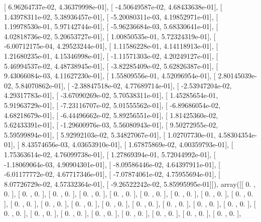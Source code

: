 \documentclass{article}
\begin{document}
       [  6.96264737e-02,   4.36379998e-01],
       [ -4.50649587e-02,   4.68433638e-01],
       [  1.43978311e-02,   5.38936457e-01],
       [ -5.20080311e-03,   4.19852971e-01],
       [  1.19978530e-01,   5.97142744e-01],
       [ -5.96236684e-03,   5.68330641e-01],
       [  4.02818736e-02,   5.20653727e-01],
       [  1.00850535e-01,   5.72324319e-01],
       [ -6.00712175e-04,   4.29523244e-01],
       [  1.11586228e-01,   4.14118913e-01],
       [  1.21680235e-01,   4.15346998e-01],
       [ -1.11571303e-02,   4.20249127e-01],
       [  5.46994537e-02,   4.48738945e-01],
       [ -3.82285409e-02,   5.62826387e-01],
       [  9.43066084e-03,   4.11627230e-01],
       [  1.55809556e-01,   4.52096954e-01],
       [  2.80145039e-02,   5.84070862e-01],
       [ -2.38847518e-02,   4.77689714e-01],
       [ -2.53947204e-02,   4.29317783e-01],
       [ -3.67090269e-02,   5.70538311e-01],
       [  1.45285654e-01,   5.91963729e-01],
       [ -7.23116707e-02,   5.01555562e-01],
       [ -6.89686054e-02,   4.68218679e-01],
       [ -6.44496662e-02,   5.89256551e-01],
       [  1.81425360e-02,   5.62433391e-01],
       [ -1.29600976e-03,   5.56080943e-01],
       [  9.50272955e-02,   5.59599894e-01],
       [  5.92992103e-02,   5.34827067e-01],
       [  1.02707730e-01,   4.58304354e-01],
       [  8.43574656e-03,   4.03653910e-01],
       [  1.67875869e-02,   4.00359793e-01],
       [  1.75363614e-02,   4.76099738e-01],
       [  1.27869394e-01,   5.72044992e-01],
       [ -1.18069064e-03,   4.90904301e-01],
       [ -8.09586446e-02,   4.64397911e-01],
       [ -6.01177772e-02,   4.67717346e-01],
       [ -7.07874061e-02,   4.75955694e-01],
       [  8.07726729e-02,   4.57332364e-01],
       [ -9.26522242e-02,   5.85995995e-01]]), array([[ 0.        ,  0.        ],
       [ 0.        ,  0.        ],
       [ 0.        ,  0.        ],
       [ 0.        ,  0.        ],
       [ 0.        ,  0.        ],
       [ 0.        ,  0.        ],
       [ 0.        ,  0.        ],
       [ 0.        ,  0.        ],
       [ 0.        ,  0.        ],
       [ 0.        ,  0.        ],
       [ 0.        ,  0.        ],
       [ 0.        ,  0.        ],
       [ 0.        ,  0.        ],
       [ 0.        ,  0.        ],
       [ 0.        ,  0.        ],
       [ 0.        ,  0.        ],
       [ 0.        ,  0.        ],
       [ 0.        ,  0.        ],
       [ 0.        ,  0.        ],
       [ 0.        ,  0.        ],
       [ 0.        ,  0.        ],
       [ 0.        ,  0.        ],
       [ 0.        ,  0.        ],
       [ 0.        ,  0.        ],
       [ 0.        ,  0.        ],
\end{document}

